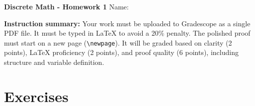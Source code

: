 \documentclass[12pt]{article}
\begin{document}
\begin{center}
    \LARGE{ \textbf{Discrete Math - Homework 1}} \Large \newline
    Name:
\end{center}

\vspace{1em}

\noindent \textbf{Instruction summary:} Your work must be uploaded to Gradescope as a single PDF file. It must be typed in LaTeX to avoid a 20\% penalty. The polished proof must start on a new page (\texttt{\textbackslash newpage}). It will be graded based on clarity (2 points), LaTeX proficiency (2 points), and proof quality (6 points), including structure and variable definition.

\section*{Exercises}
\end{document}
